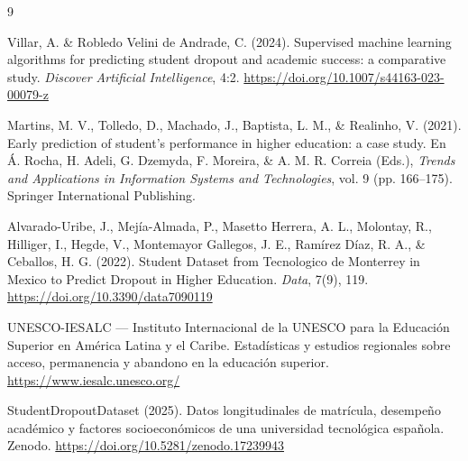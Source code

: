 \documentclass[11pt,a4paper]{article}
\begin{document}
\begin{thebibliography}{9}

Villar, A. \& Robledo Velini de Andrade, C. (2024). Supervised machine learning algorithms for predicting student dropout and academic success: a comparative study. \textit{Discover Artificial Intelligence}, 4:2. \url{https://doi.org/10.1007/s44163-023-00079-z}

Martins, M. V., Tolledo, D., Machado, J., Baptista, L. M., \& Realinho, V. (2021). Early prediction of student's performance in higher education: a case study. En Á. Rocha, H. Adeli, G. Dzemyda, F. Moreira, \& A. M. R. Correia (Eds.), \textit{Trends and Applications in Information Systems and Technologies}, vol. 9 (pp. 166--175). Springer International Publishing.

Alvarado-Uribe, J., Mejía-Almada, P., Masetto Herrera, A. L., Molontay, R., Hilliger, I., Hegde, V., Montemayor Gallegos, J. E., Ramírez Díaz, R. A., \& Ceballos, H. G. (2022). Student Dataset from Tecnologico de Monterrey in Mexico to Predict Dropout in Higher Education. \textit{Data}, 7(9), 119. \url{https://doi.org/10.3390/data7090119}

UNESCO-IESALC --- Instituto Internacional de la UNESCO para la Educación Superior en América Latina y el Caribe. Estadísticas y estudios regionales sobre acceso, permanencia y abandono en la educación superior. \url{https://www.iesalc.unesco.org/}

StudentDropoutDataset (2025). Datos longitudinales de matrícula, desempeño académico y factores socioeconómicos de una universidad tecnológica española. Zenodo. \url{https://doi.org/10.5281/zenodo.17239943}

\end{thebibliography}
\end{document}

